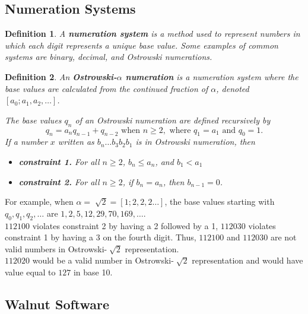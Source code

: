 \documentclass[landscape]{sciposter}
\newtheorem*{definition}{Definition}
\begin{document}
\begin{multicols}{3}
\begin{mdframed}[style=MyFrame]
\subsection*{Numeration Systems}
\end{mdframed}
\begin{definition}A \textbf{numeration system} is a method used to represent numbers in which each digit represents a unique base value. Some examples of common systems are binary, decimal, and Ostrowski numerations.
\end{definition}
\begin{definition}
An \textbf{Ostrowski-$\alpha$ numeration} is a numeration system where the base values are calculated from the continued fraction of $\alpha$, denoted $[a_0; a_{1},a_{2}, \ldots]$.

The base values $q_{n}$ of an Ostrowski numeration are defined recursively by{
\setlength{\abovedisplayskip}{3pt}
\setlength{\belowdisplayskip}{3pt}
$$q_{n}=a_{n}q_{n-1}+q_{n-2} \text{ when } n \ge 2, \text{ where } q_{1}=a_1 \text{ and } q_{0}=1.$$}
If a number $x$ written as $b_n\dots b_3b_2b_1$ is in Ostrowski numeration, then
\begin{itemize}
\item \textbf{constraint 1.} For all $n\ge 2$, $b_n\le a_n$, and $b_1 < a_1$
\item \textbf{constraint 2.} For all $n\ge 2$, if $b_{n} = a_{n}$, then $b_{n-1} = 0$.
\end{itemize}
\end{definition}
For example, when $\alpha = \sqrt[~]{2} = [1;2,2,2\dots]$, the base values starting with $q_0, q_1, q_2, \dots$ are $1, 2, 5, 12, 29, 70, 169, \dots$.\\
$112100$ violates constraint 2 by having a 2 followed by a 1, $112030$ violates constraint 1 by having a 3 on the fourth digit. Thus, $112100$ and $112030$ are not valid numbers in Ostrowski-$\sqrt[~]{2}$ representation.\\
$112020$ would be a valid number in Ostrowski-$\sqrt[~]{2}$ representation and would have value equal to $127$ in base 10.\\

\begin{mdframed}[style=MyFrame]
\subsection*{Walnut Software}
\end{mdframed}


\end{multicols}
\end{document}
